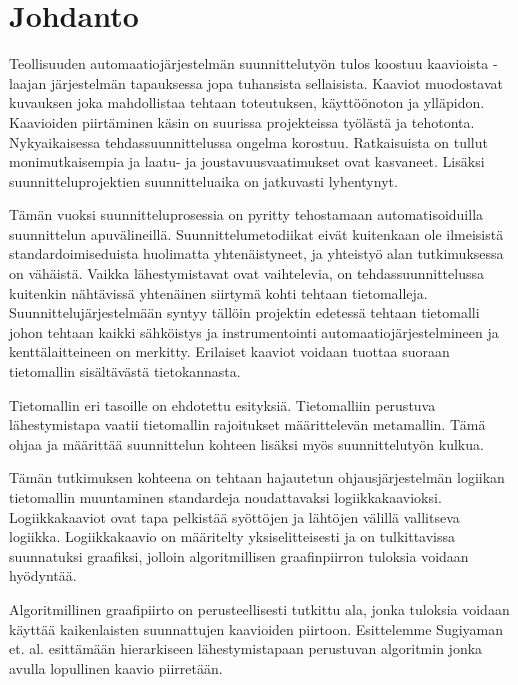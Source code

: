 \documentclass[finnish,12pt]{article}
\begin{document}
	\cleardoublepage
	\storeinipagenumber
	\setcounter{page}{1}

	\section{Johdanto}
	\thispagestyle{empty}

Teollisuuden automaatiojärjestelmän suunnittelutyön tulos koostuu kaavioista - laajan järjestelmän tapauksessa jopa tuhansista sellaisista. Kaaviot muodostavat kuvauksen joka mahdollistaa tehtaan toteutuksen, käyttöönoton ja ylläpidon. Kaavioiden piirtäminen käsin on suurissa projekteissa työlästä ja tehotonta. Nykyaikaisessa tehdassuunnittelussa ongelma korostuu. Ratkaisuista on tullut monimutkaisempia ja laatu- ja joustavuusvaatimukset ovat kasvaneet. Lisäksi suunnitteluprojektien suunnitteluaika on jatkuvasti lyhentynyt.

Tämän vuoksi suunnitteluprosessia on pyritty tehostamaan automatisoiduilla suunnittelun apuvälineillä. Suunnittelumetodiikat eivät kuitenkaan ole ilmeisistä standardoimiseduista huolimatta yhtenäistyneet, ja yhteistyö alan tutkimuksessa on vähäistä. Vaikka lähestymistavat ovat vaihtelevia, on tehdassuunnittelussa kuitenkin nähtävissä yhtenäinen siirtymä kohti tehtaan tietomalleja. Suunnittelujärjestelmään syntyy tällöin projektin edetessä tehtaan tietomalli johon tehtaan kaikki sähköistys ja instrumentointi automaatiojärjestelmineen ja kenttälaitteineen on merkitty. Erilaiset kaaviot voidaan tuottaa suoraan tietomallin sisältävästä tietokannasta.

Tietomallin eri tasoille on ehdotettu esityksiä. Tietomalliin perustuva lähestymistapa vaatii tietomallin rajoitukset määrittelevän metamallin. Tämä ohjaa ja määrittää suunnittelun kohteen lisäksi myös suunnittelutyön kulkua.

Tämän tutkimuksen kohteena on tehtaan hajautetun ohjausjärjestelmän logiikan tietomallin muuntaminen standardeja noudattavaksi logiikkakaavioksi. Logiikkakaaviot ovat tapa pelkistää syöttöjen ja lähtöjen välillä vallitseva logiikka. Logiikkakaavio on määritelty yksiselitteisesti ja on tulkittavissa suunnatuksi graafiksi, jolloin algoritmillisen graafinpiirron tuloksia voidaan hyödyntää.

Algoritmillinen graafipiirto on perusteellisesti tutkittu ala, jonka tuloksia voidaan käyttää kaikenlaisten suunnattujen kaavioiden piirtoon. Esittelemme Sugiyaman et. al. \cite{RefWorks:9} esittämään hierarkiseen lähestymistapaan perustuvan algoritmin jonka avulla lopullinen kaavio piirretään.
\end{document}
